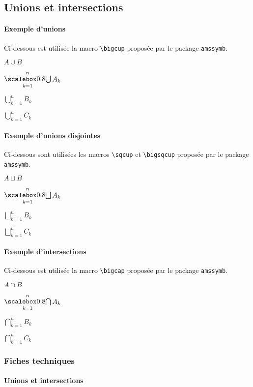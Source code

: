 \documentclass[12pt,a4paper]{article}
\begin{document}

\subsection{Unions et intersections}

\paragraph{Exemple d'unions}

Ci-dessous est utilisée la macro \verb+\bigcup+ proposée par le package \verb+amssymb+.

\begin{latexex}
$A \cup B$

$\dcup_{k=1}^{n} A_k$

$\bigcup_{k=1}^{n} B_k$

$\displaystyle \bigcup_{k=1}^{n} C_k$
\end{latexex}




\paragraph{Exemple d'unions disjointes}

Ci-dessous sont utilisées les macros \verb+\sqcup+ et \verb+\bigsqcup+ proposée par le package \verb+amssymb+.

\begin{latexex}
$A\sqcup B$

$\dsqcup_{k=1}^{n} A_k$

$\bigsqcup_{k=1}^{n} B_k$

$\displaystyle \bigsqcup_{k=1}^{n} C_k$
\end{latexex}




\paragraph{Exemple d'intersections}

Ci-dessous est utilisée la macro \verb+\bigcap+ proposée par le package \verb+amssymb+.

\begin{latexex}
$A \cap B$

$\dcap_{k=1}^{n} A_k$

$\bigcap_{k=1}^{n} B_k$

$\displaystyle \bigcap_{k=1}^{n} C_k$
\end{latexex}




\subsubsection{Fiches techniques}

\paragraph{Unions et intersections}



\end{document}
